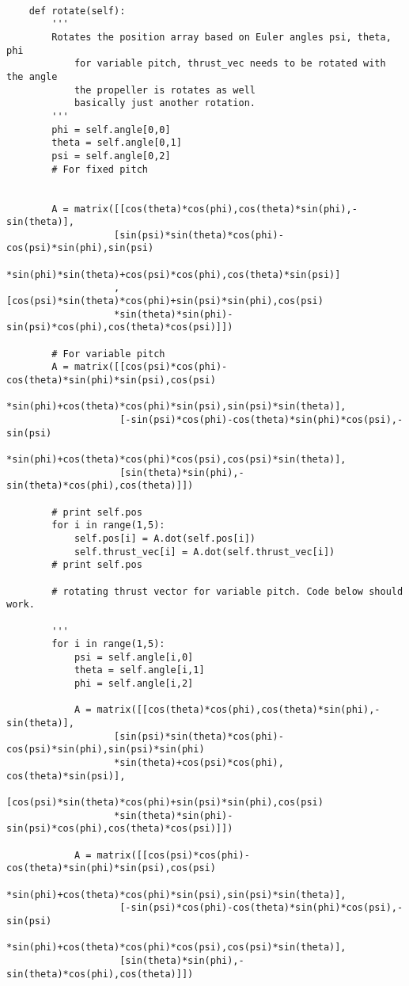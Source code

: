 \begin{lstlisting}
 
    def rotate(self):
        '''
        Rotates the position array based on Euler angles psi, theta, phi
            for variable pitch, thrust_vec needs to be rotated with the angle 
            the propeller is rotates as well
            basically just another rotation.
        '''
        phi = self.angle[0,0]
        theta = self.angle[0,1]
        psi = self.angle[0,2]
        # For fixed pitch
        
        
        A = matrix([[cos(theta)*cos(phi),cos(theta)*sin(phi),-sin(theta)],
                   [sin(psi)*sin(theta)*cos(phi)-cos(psi)*sin(phi),sin(psi)
                   *sin(phi)*sin(theta)+cos(psi)*cos(phi),cos(theta)*sin(psi)]
                   ,[cos(psi)*sin(theta)*cos(phi)+sin(psi)*sin(phi),cos(psi)
                   *sin(theta)*sin(phi)-sin(psi)*cos(phi),cos(theta)*cos(psi)]])
                   
        # For variable pitch
        A = matrix([[cos(psi)*cos(phi)-cos(theta)*sin(phi)*sin(psi),cos(psi)
                    *sin(phi)+cos(theta)*cos(phi)*sin(psi),sin(psi)*sin(theta)],
                    [-sin(psi)*cos(phi)-cos(theta)*sin(phi)*cos(psi),-sin(psi)
                    *sin(phi)+cos(theta)*cos(phi)*cos(psi),cos(psi)*sin(theta)],
                    [sin(theta)*sin(phi),-sin(theta)*cos(phi),cos(theta)]])
   
        # print self.pos
        for i in range(1,5):
            self.pos[i] = A.dot(self.pos[i])
            self.thrust_vec[i] = A.dot(self.thrust_vec[i])
        # print self.pos
   
        # rotating thrust vector for variable pitch. Code below should work.
        
        '''
        for i in range(1,5):
            psi = self.angle[i,0]
            theta = self.angle[i,1]
            phi = self.angle[i,2]

            A = matrix([[cos(theta)*cos(phi),cos(theta)*sin(phi),-sin(theta)],  
                   [sin(psi)*sin(theta)*cos(phi)-cos(psi)*sin(phi),sin(psi)*sin(phi)
                   *sin(theta)+cos(psi)*cos(phi), cos(theta)*sin(psi)],
                   [cos(psi)*sin(theta)*cos(phi)+sin(psi)*sin(phi),cos(psi)
                   *sin(theta)*sin(phi)-sin(psi)*cos(phi),cos(theta)*cos(psi)]])

            A = matrix([[cos(psi)*cos(phi)-cos(theta)*sin(phi)*sin(psi),cos(psi)
                    *sin(phi)+cos(theta)*cos(phi)*sin(psi),sin(psi)*sin(theta)],
                    [-sin(psi)*cos(phi)-cos(theta)*sin(phi)*cos(psi),-sin(psi)
                    *sin(phi)+cos(theta)*cos(phi)*cos(psi),cos(psi)*sin(theta)],
                    [sin(theta)*sin(phi),-sin(theta)*cos(phi),cos(theta)]])
            

\end{lstlisting}
